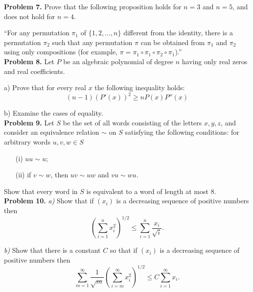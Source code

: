 \documentclass{article}
\begin{document}
\textbf{Problem 7.}
Prove that the following proposition holds for $n = 3$ and $n = 5$,
and does not hold for $n = 4$.

\quad ``For any permutation $\pi_1$ of $\{1,2, \dots, n\}$ different from the identity,
there is a permutation $\pi_2$ such that any permutation $\pi$ can be obtained from $\pi_1$ and $\pi_2$ using only compositions (for example, $\pi = \pi_1 \circ \pi_1 \circ \pi_2 \circ \pi_1$).''
\\

\textbf{Problem 8.}
Let $P$ be an algebraic polynomial of degree $n$ having only real zeros
and real coefficients.

a) Prove that for every real $x$ the following inequality holds:
\[
(n - 1)(P'(x))^2 \geq nP(x)P''(x)
\]

b) Examine the cases of equality.
\\

\textbf{Problem 9.}
Let $S$ be the set of all words consisting of the letters $x, y, z$, and consider an equivalence relation $\sim$ on $S$ satisfying the following conditions: for arbitrary words $u, v, w \in S$
\begin{itemize}
    \item[(i)] $uu \sim u$;
    \item[(ii)] if $v \sim w$, then $uv \sim uw$ and $vu \sim wu$.
\end{itemize}
Show that every word in $S$ is equivalent to a word of length at most $8$.
\\

\textbf{Problem 10.}
\textit{a)} Show that if $(x_i)$ is a decreasing sequence of positive numbers then
\[
\left( \sum_{i=1}^{n} x_i^2 \right)^{1/2} \leq \sum_{i=1}^{n} \frac{x_i}{\sqrt{i}}.
\]

\textit{b)} Show that there is a constant $C$ so that if $(x_i)$ is a decreasing sequence of positive numbers then
\[
\sum_{m=1}^{\infty} \frac{1}{\sqrt{m}} \left( \sum_{i=m}^{\infty} x_i^2 \right)^{1/2} \leq C \sum_{i=1}^{\infty} x_i.
\]
\end{document}
